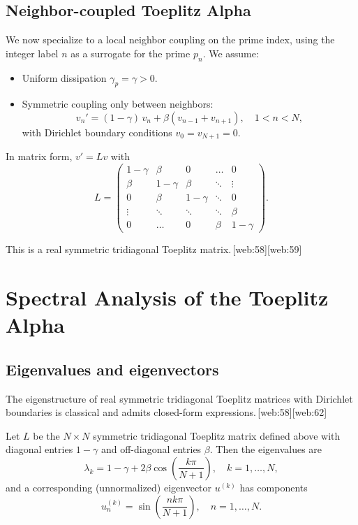 \documentclass[11pt]{article}
\begin{document}
\subsection{Neighbor-coupled Toeplitz Alpha}

We now specialize to a local neighbor coupling on the prime index, using the integer label \(n\) as a surrogate for the prime \(p_n\). We assume:
\begin{itemize}
  \item Uniform dissipation \(\gamma_p = \gamma > 0\).
  \item Symmetric coupling only between neighbors:
  \begin{equation}
    v_n' = (1 - \gamma)\, v_n + \beta (v_{n-1} + v_{n+1}), \quad 1 < n < N,
  \end{equation}
  with Dirichlet boundary conditions \(v_0 = v_{N+1} = 0\).
\end{itemize}

In matrix form, \(v' = L v\) with
\[
L =
\begin{pmatrix}
1-\gamma & \beta      & 0        & \dots  & 0 \\
\beta      & 1-\gamma & \beta    & \ddots & \vdots \\
0          & \beta      & 1-\gamma & \ddots & 0 \\
\vdots     & \ddots   & \ddots   & \ddots & \beta \\
0          & \dots    & 0        & \beta  & 1-\gamma
\end{pmatrix}.
\]

This is a real symmetric tridiagonal Toeplitz matrix.\,[web:58][web:59]

\section{Spectral Analysis of the Toeplitz Alpha}

\subsection{Eigenvalues and eigenvectors}

The eigenstructure of real symmetric tridiagonal Toeplitz matrices with Dirichlet boundaries is classical and admits closed-form expressions.\,[web:58][web:62]

\begin{theorem}
Let \(L\) be the \(N \times N\) symmetric tridiagonal Toeplitz matrix defined above with diagonal entries \(1-\gamma\) and off-diagonal entries \(\beta\). Then the eigenvalues are
\begin{equation}
\lambda_k = 1 - \gamma + 2\beta \cos\left(\frac{k\pi}{N+1}\right), \quad k = 1,\dots,N,
\label{eq:eigenvalues}
\end{equation}
and a corresponding (unnormalized) eigenvector \(u^{(k)}\) has components
\begin{equation}
u_n^{(k)} = \sin\left(\frac{n k \pi}{N+1}\right), \quad n = 1,\dots,N.
\label{eq:eigenvectors}
\end{equation}
\end{theorem}
\end{document}

